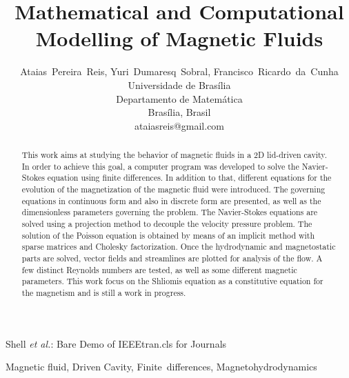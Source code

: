 \documentclass[journal]{IEEEtran}
\begin{document}
\title{Mathematical and Computational Modelling of Magnetic Fluids}

\author{Ataias~Pereira~Reis, Yuri~Dumaresq~Sobral, Francisco~Ricardo~da~Cunha\\Universidade de Brasília\\Departamento de Matemática\\Brasília, Brasil\\ataiasreis@gmail.com}

%
{Shell \MakeLowercase{\textit{et al.}}: Bare Demo of IEEEtran.cls for Journals}

\maketitle


\begin{abstract}
This work aims at studying the behavior of magnetic fluids in a 2D lid-driven cavity. In order to achieve this goal, a computer program was developed to solve the Navier-Stokes equation using finite differences. In addition to that, different equations for the evolution of the magnetization of the magnetic fluid were introduced. The governing equations in continuous form and also in discrete form are presented, as well as the dimensionless parameters governing the problem. The Navier-Stokes equations are solved using a projection method to decouple the velocity pressure problem. The solution of the Poisson equation is obtained by means of an implicit method with sparse matrices and Cholesky factorization. Once the hydrodynamic and magnetostatic parts are solved, vector fields and streamlines are plotted for analysis of the flow. A few distinct Reynolds numbers are tested, as well as some different magnetic parameters. This work focus on the Shliomis equation as a constitutive equation for the magnetism and is still a work in progress.

\end{abstract}

\begin{IEEEkeywords}
Magnetic fluid, Driven Cavity, Finite~differences, Magnetohydrodynamics
\end{IEEEkeywords}
\end{document}
